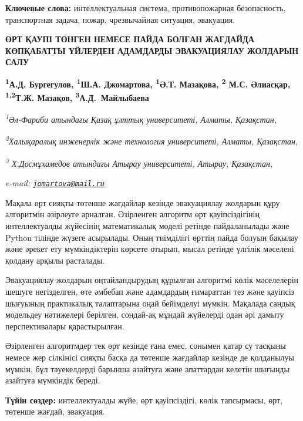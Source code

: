 {\bfseries Ключевые слова:} интеллектуальная система, противопожарная
безопасность, транспортная задача, пожар, чрезвычайная ситуация,
эвакуация.

\begin{articleheader}
{\bfseries ӨРТ ҚАУПІ ТӨНГЕН НЕМЕСЕ ПАЙДА БОЛҒАН ЖАҒДАЙДА КӨПҚАБАТТЫ ҮЙЛЕРДЕН АДАМДАРДЫ ЭВАКУАЦИЯЛАУ ЖОЛДАРЫН САЛУ}

{\bfseries \textsuperscript{1}А.Д. Бургегулов,
\textsuperscript{1}Ш.А. Джомартова\textsuperscript{\envelope },
\textsuperscript{1}Ә.Т. Мазақова,
\textsuperscript{2} М.С. Әлиасқар,
\textsuperscript{1,2}Т.Ж. Мазақов,
\textsuperscript{3}А.Д.~Майлыбаева}
\end{articleheader}

\begin{affiliation}
\emph{\textsuperscript{1}Әл-Фараби атындағы Қазақ ұлттық университеті, Алматы, Қазақстан,}

\emph{\textsuperscript{2}Халықаралық инженерлік және технология университеті, Алматы, Қазақстан,}

\emph{\textsuperscript{3} Х.Досмұхамедов атындағы Атырау университеті, Атырау, Қазақстан,}

\emph{e-mail: \href{mailto:jomartova@mail.ru}{\nolinkurl{jomartova@mail.ru}}}
\end{affiliation}

Мақала өрт сияқты төтенше жағдайлар кезінде эвакуациялау жолдарын құру
алгоритмін әзірлеуге арналған. Әзірленген алгоритм өрт қауіпсіздігінің
интеллектуалды жүйесінің математикалық моделі ретінде пайдаланылады және
Python тілінде жүзеге асырылады. Оның тиімділігі өрттің пайда болуын
бақылау және әрекет ету мүмкіндіктерін көрсете отырып, мысал ретінде
үлгілік мәселені қолдану арқылы расталады.

Эвакуациялау жолдарын оңтайландырудың құрылған алгоритмі көлік
мәселелерін шешуге негізделген, өте әмбебап және адамдардың ғимараттан
тез және қауіпсіз шығуының практикалық талаптарына оңай бейімделуі
мүмкін. Мақалада сандық модельдеу нәтижелері берілген, сондай-ақ мұндай
жүйелерді одан әрі дамыту перспективалары қарастырылған.

Әзірленген алгоритмдер тек өрт кезінде ғана емес, сонымен қатар су
тасқыны немесе жер сілкінісі сияқты басқа да төтенше жағдайлар кезінде
де қолданылуы мүмкін, бұл тәуекелдерді барынша азайтуға және апаттардан
келетін шығынды азайтуға мүмкіндік береді.

{\bfseries Түйін сөздер:} интеллектуалды жүйе, өрт қауіпсіздігі, көлік
тапсырмасы, өрт, төтенше жағдай, эвакуация.

